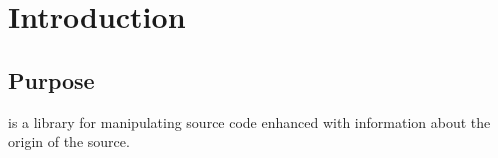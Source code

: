 \chapter{Introduction}
%

\section{Purpose}

\sysname{} is a library for manipulating \commonlisp{} source code
enhanced with information about the origin of the source.
